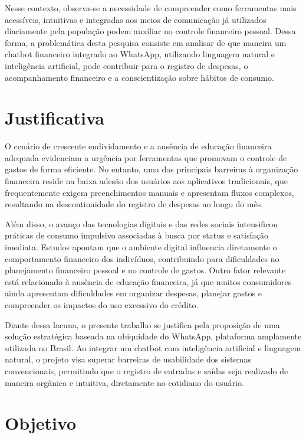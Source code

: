 Nesse contexto, observa-se a necessidade de compreender como ferramentas mais acessíveis, intuitivas e integradas aos meios de comunicação já utilizados diariamente pela população podem auxiliar no controle financeiro pessoal. Dessa forma, a problemática desta pesquisa consiste em analisar de que maneira um chatbot financeiro integrado ao WhatsApp, utilizando linguagem natural e inteligência artificial, pode contribuir para o registro de despesas, o acompanhamento financeiro e a conscientização sobre hábitos de consumo.

\section{Justificativa}

O cenário de crescente endividamento e a ausência de educação financeira adequada evidenciam a urgência por ferramentas que promovam o controle de gastos de forma eficiente. No entanto, uma das principais barreiras à organização financeira reside na baixa adesão dos usuários aos aplicativos tradicionais, que frequentemente exigem preenchimentos manuais e apresentam fluxos complexos, resultando na descontinuidade do registro de despesas ao longo do mês.

Além disso, o avanço das tecnologias digitais e das redes sociais intensificou práticas de consumo impulsivo associadas à busca por status e satisfação imediata. Estudos apontam que o ambiente digital influencia diretamente o comportamento financeiro dos indivíduos, contribuindo para dificuldades no planejamento financeiro pessoal e no controle de gastos. Outro fator relevante está relacionado à ausência de educação financeira, já que muitos consumidores ainda apresentam dificuldades em organizar despesas, planejar gastos e compreender os impactos do uso excessivo do crédito.

Diante dessa lacuna, o presente trabalho se justifica pela proposição de uma solução estratégica baseada na ubiquidade do WhatsApp, plataforma amplamente utilizada no Brasil. Ao integrar um chatbot com inteligência artificial e linguagem natural, o projeto visa superar barreiras de usabilidade dos sistemas convencionais, permitindo que o registro de entradas e saídas seja realizado de maneira orgânica e intuitiva, diretamente no cotidiano do usuário.

\section{Objetivo}

